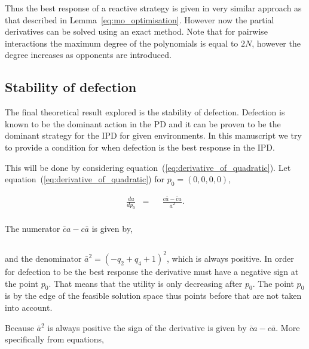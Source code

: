 \documentclass[10pt]{article}
\begin{document}
Thus the best response of a reactive strategy is given in very similar approach
as that described in Lemma~\ref{eq:mo_optimisation}. However now the partial derivatives can be
solved using an exact method. Note that for pairwise interactions the maximum degree
of the polynomials is equal to \(2N\), however the degree increases as opponents
are introduced.

\subsection{Stability of defection}

The final theoretical result explored is the stability of defection. Defection is
known to be the dominant action in the PD and it can be proven to be the dominant
strategy for the IPD for given environments. In this manuscript we try to provide a
condition for when defection is the best response in the IPD.

This will be done by considering equation~(\ref{eq:derivative_of_quadratic}).
Let equation~(\ref{eq:derivative_of_quadratic}) for \(p_0 = (0, 0, 0, 0)\),

\begin{equation}\label{eq:derivative_of_quadratic_zero}
    \begin{aligned}
     \frac{du}{dp_0} & = && \frac{c \bar{a} - \bar{c}a}
      {\bar{a}^2} .\\
    \end{aligned}
\end{equation}

The numerator \(\bar{c}a - c\bar{a}\) is given by,

\[\]

and the denominator \(\bar{a} ^ 2 = (-q_2 + q_4 + 1) ^ 2\), which is always positive. In order
for defection to be the best response the derivative must have a negative
sign at the point \(p_0\). That means that the utility is only
decreasing after \(p_0\). The point \(p_0\) is by the edge of the feasible solution space
thus points before that are not taken into account.

Because \(\bar{a} ^ 2\) is always positive the sign of the derivative is given by \(\bar{c}a - c\bar{a}\).
More specifically from equations,

\begin{equation}\label{eq:defection_condition_one}
    
\end{equation}
\begin{equation}\label{eq:defection_condition_two}
    
\end{equation}
\end{document}
